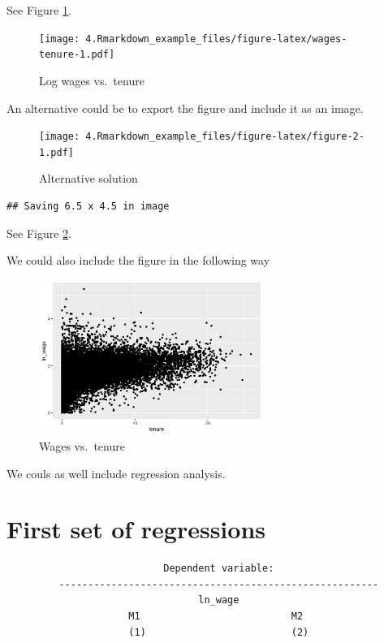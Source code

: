 \documentclass[
]{article}
\begin{document}
See Figure \ref{fig:wages-tenure}.

\begin{figure}
\centering
\texttt{[image: 4.Rmarkdown\_example\_files/figure-latex/wages-tenure-1.pdf]}
\caption{\label{fig:wages-tenure}Log wages vs.~tenure}
\end{figure}

An alternative could be to export the figure and include it as an image.

\begin{figure}
\centering
\texttt{[image: 4.Rmarkdown\_example\_files/figure-latex/figure-2-1.pdf]}
\caption{\label{fig:figure-2}Alternative solution}
\end{figure}

\begin{verbatim}
## Saving 6.5 x 4.5 in image
\end{verbatim}

See Figure \ref{fig:figure-2}.

We could also include the figure in the following way

\begin{figure}
\centering
\includegraphics[width=0.65\textwidth,height=\textheight]{./images/wages.png}
\caption{Wages vs.~tenure}
\end{figure}

We couls as well include regression analysis.

\hypertarget{first-set-of-regressions}{%
\section{First set of regressions}\label{first-set-of-regressions}}

\begin{verbatim}
                           Dependent variable:                  
         -------------------------------------------------------
                                 ln_wage                        
                     M1                          M2             
                     (1)                         (2)            
\end{verbatim}
\end{document}
